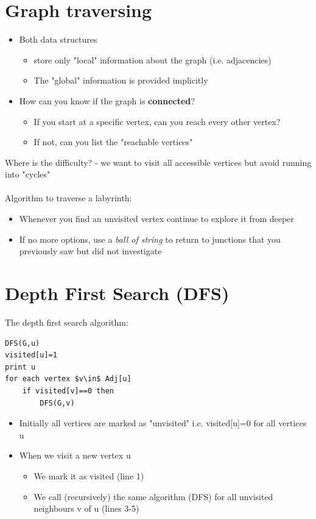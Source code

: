 \documentclass{article}[18pt]
\begin{document}
\section{Graph traversing}
\begin{itemize}
	\item Both data structures
	\begin{itemize}
		\item store only "local" information about the graph (i.e. adjacencies)
		\item The "global" information is provided implicitly
	\end{itemize}
	\item How can you know if the graph is \textbf{connected}?
	\begin{itemize}
		\item If you start at a specific vertex, can you reach every other vertex?
		\item If not, can you list the "reachable vertices"
	\end{itemize}
\end{itemize}
Where is the difficulty? -  we want to visit all accessible vertices but avoid running into "cycles"\\
\\
Algorithm to traverse a labyrinth:
\begin{itemize}
	\item Whenever you find an unvisited vertex continue to explore it from deeper
	\item If no more options, use a \textit{ball of string} to return to junctions that you previously saw but did not investigate
\end{itemize}
\section{Depth First Search (DFS)}
The depth first search algorithm:
\begin{lstlisting}
DFS(G,u)
visited[u]=1
print u
for each vertex $v\in$ Adj[u]
	if visited[v]==0 then
		DFS(G,v)
\end{lstlisting}
\begin{itemize}
	\item Initially all vertices are marked as "unvisited" i.e. visited[u]=0 for all vertices u
	\item When we visit a new vertex u
	\begin{itemize}
		\item We mark it as visited (line 1)
		\item We call (recursively) the same algorithm (DFS) for all unvisited neighbours v of u (lines 3-5)
	\end{itemize}
\end{itemize}
\end{document}
